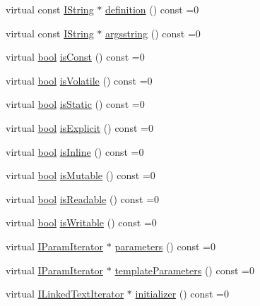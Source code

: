 \begin{DoxyCompactItemize}
virtual const \hyperlink{class_i_string}{I\+String} $\ast$ \hyperlink{class_i_member_a17bf37f15c7b71c1654a9434d1a04c14}{definition} () const  =0
\item 
virtual const \hyperlink{class_i_string}{I\+String} $\ast$ \hyperlink{class_i_member_a370b7eecee959eacb90f91c6ef153f82}{argsstring} () const  =0
\item 
virtual \hyperlink{qglobal_8h_a1062901a7428fdd9c7f180f5e01ea056}{bool} \hyperlink{class_i_member_a6bb0217d28c3c4b1629af1f1701801fc}{is\+Const} () const  =0
\item 
virtual \hyperlink{qglobal_8h_a1062901a7428fdd9c7f180f5e01ea056}{bool} \hyperlink{class_i_member_a3fdbf2abadce789ba6393a7317caeda8}{is\+Volatile} () const  =0
\item 
virtual \hyperlink{qglobal_8h_a1062901a7428fdd9c7f180f5e01ea056}{bool} \hyperlink{class_i_member_aa6d4de8c7e1f4fb5cf8d3ebcd7e85c6e}{is\+Static} () const  =0
\item 
virtual \hyperlink{qglobal_8h_a1062901a7428fdd9c7f180f5e01ea056}{bool} \hyperlink{class_i_member_a7799cb7160c96aab7b8a8df34dbf9b57}{is\+Explicit} () const  =0
\item 
virtual \hyperlink{qglobal_8h_a1062901a7428fdd9c7f180f5e01ea056}{bool} \hyperlink{class_i_member_aab89e9522c1e47abe03100f1c1f69699}{is\+Inline} () const  =0
\item 
virtual \hyperlink{qglobal_8h_a1062901a7428fdd9c7f180f5e01ea056}{bool} \hyperlink{class_i_member_a9847cb09d381efea6eeee60d7011c28c}{is\+Mutable} () const  =0
\item 
virtual \hyperlink{qglobal_8h_a1062901a7428fdd9c7f180f5e01ea056}{bool} \hyperlink{class_i_member_a5ab2224aae08d76a0cf079f75d7d89cc}{is\+Readable} () const  =0
\item 
virtual \hyperlink{qglobal_8h_a1062901a7428fdd9c7f180f5e01ea056}{bool} \hyperlink{class_i_member_af37c7310df3edb8be7f3835763228b83}{is\+Writable} () const  =0
\item 
virtual \hyperlink{class_i_param_iterator}{I\+Param\+Iterator} $\ast$ \hyperlink{class_i_member_a5855dfb76aba6f5646d1246a00f392ee}{parameters} () const  =0
\item 
virtual \hyperlink{class_i_param_iterator}{I\+Param\+Iterator} $\ast$ \hyperlink{class_i_member_a49ae8d3af3060a6e573387a98afeeed8}{template\+Parameters} () const  =0
\item 
virtual \hyperlink{class_i_linked_text_iterator}{I\+Linked\+Text\+Iterator} $\ast$ \hyperlink{class_i_member_a71d431343387fc9ec7b9685404671d65}{initializer} () const  =0

\end{DoxyCompactItemize}
